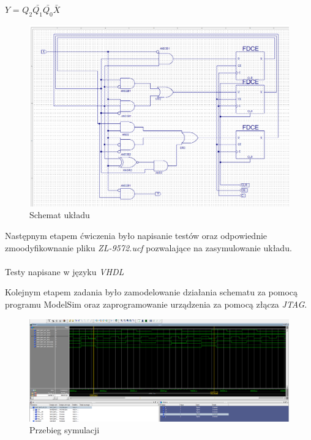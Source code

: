 \documentclass[wide,a4paper,titlepage,12pt] {article}
\begin{document}
  \begin{center}
    $Y$ = $Q_{2} \bar{Q_{1}} \bar{Q_{0}} \bar{X} $
  \end{center}


  \begin{figure}[htbp]
    \begin{center}
      \includegraphics[scale=0.4]{mealy-sch.png}
      \caption{Schemat układu}
     \end{center}
  \end{figure}

  Następnym etapem ćwiczenia było napisanie testów oraz odpowiednie zmoodyfikownanie pliku \textit{ZL-9572.ucf} pozwalające na zasymulowanie układu.



  \newpage
  \paragraph{}
  Testy napisane w języku \textit{VHDL}
  

  Kolejnym etapem zadania było zamodelowanie działania schematu za pomocą programu ModelSim oraz zaprogramowanie urządzenia za pomocą złącza \textit{JTAG}.

  \begin{figure}[htbp]
    \begin{center}
      \includegraphics[scale=0.3]{mealy-sim.png}
      \caption{Przebieg symulacji}
     \end{center}
  \end{figure}
\end{document}
